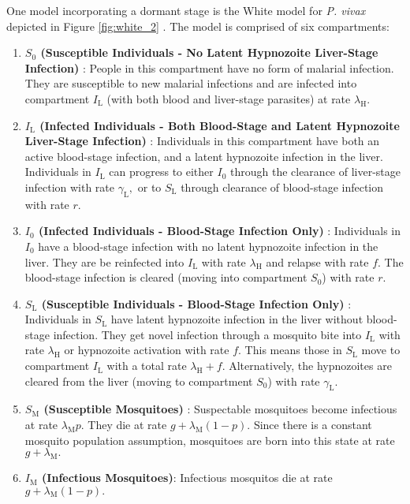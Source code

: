 One model incorporating a dormant stage is the White model
for \textit{P. vivax} depicted in
Figure \ref{fig:white_2} \parencite[Tropical Model]{white_variation_2016}.
The model is comprised of six compartments: \begin{enumerate}
    \item \textbf{
              $S_0$ (Susceptible Individuals - No Latent Hypnozoite 
              Liver-Stage Infection)
          }: People in this compartment have no form of malarial infection.
          They are susceptible to new malarial infections
          and are infected into compartment $I_\mathrm{L}$ (with both blood
          and liver-stage parasites) at rate $\lambda_\mathrm{H}$.
    \item \textbf{
              $I_\mathrm{L}$ (Infected Individuals - Both Blood-Stage and Latent
              Hypnozoite Liver-Stage Infection)
          }:  Individuals in this compartment have both an active blood-stage
          infection, and a latent hypnozoite infection in the liver.
          Individuals in $I_\mathrm{L}$ can
          progress to either $I_0$ through the clearance of liver-stage
          infection with rate $\gamma_\mathrm{L},$ or to $S_\mathrm{L}$ through
          clearance of blood-stage infection with rate $r$.
    \item \textbf{
              $I_0$ (Infected Individuals - Blood-Stage Infection Only)
          }: Individuals in $I_0$ have a blood-stage infection with no
          latent hypnozoite infection in the liver. They are be reinfected into
          $I_\mathrm{L}$ with rate $\lambda_\mathrm{H}$ and relapse with rate $f$.
          The blood-stage infection is cleared (moving into compartment $S_0$) with
          rate $r$.
    \item \textbf{
              $S_\mathrm{L}$ (Susceptible Individuals -
              Blood-Stage Infection Only)
          }: Individuals in $S_\mathrm{L}$ have latent hypnozoite infection in
          the liver without blood-stage infection. They get novel infection
          through a mosquito bite into $I_\mathrm{L}$ with rate
          $\lambda_\mathrm{H}$ or hypnozoite activation with rate $f$.
          This means those in $S_\mathrm{L}$ move to compartment
          $I_\mathrm{L}$ with a total rate $\lambda_\mathrm{H} + f.$
          Alternatively, the hypnozoites are cleared from the liver
          (moving to compartment $S_0$) with rate $\gamma_\mathrm{L}.$
    \item \textbf{
              $S_\mathrm{M}$ (Susceptible Mosquitoes)
          }:
          Suspectable mosquitoes become infectious at rate
          $\lambda_\mathrm{M}p.$ They die at rate
          $g + \lambda_\mathrm{M}(1 - p).$ Since there is a constant mosquito
          population assumption, mosquitoes are born into this state at rate
          $g + \lambda_\mathrm{M}.$
    \item \textbf{$I_\mathrm{M}$ (Infectious Mosquitoes)}:
          Infectious mosquitos die at rate $g + \lambda_\mathrm{M}(1 - p).$
\end{enumerate}

